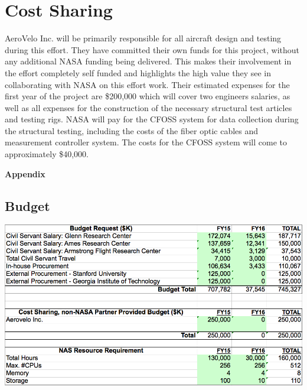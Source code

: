 \documentclass[]{aiaa-tc}
\begin{document}
  \section{Cost Sharing}
    AeroVelo Inc. will be primarily responsible for all aircraft design and testing during this effort. 
    They have committed their own funds for this project, without any additional NASA funding being delivered.
    This makes their involvement in the effort completely self funded and highlights the high value they see 
    in collaborating with NASA on this effort work. Their estimated expenses for the first year of the project are \$200,000 
    which will cover two engineers salaries, as well as all expenses for the construction of the necessary 
    structural test articles and testing rigs. NASA will pay for the CFOSS system for data collection during the 
    structural testing, including the costs of the fiber optic cables and measurement controller system. The costs for 
    the CFOSS system will come to approximately \$40,000.



  \clearpage
  

  \appendix
  \clearpage
  \centerline{\huge{\textbf{Appendix}}}

  \begin{landscape}
  \section{Budget}
    \centering
    \includegraphics[height=\textheight]{images/budget_request}
    \end{landscape}
\end{document}
